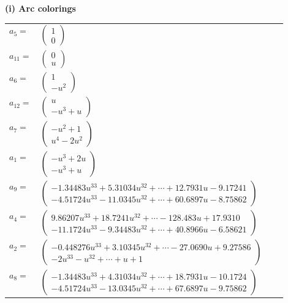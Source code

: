 \documentclass[1p]{elsarticle_modified}
\theoremstyle{definition}
\begin{document}
\flushleft \textbf{(i) Arc colorings}\\
\begin{tabular}{m{7pt} m{180pt} m{7pt} m{180pt} }
\flushright $a_{5}=$&$\begin{pmatrix}1\\0\end{pmatrix}$ \\
\flushright $a_{11}=$&$\begin{pmatrix}0\\u\end{pmatrix}$ \\
\flushright $a_{6}=$&$\begin{pmatrix}1\\- u^2\end{pmatrix}$ \\
\flushright $a_{12}=$&$\begin{pmatrix}u\\- u^3+u\end{pmatrix}$ \\
\flushright $a_{7}=$&$\begin{pmatrix}- u^2+1\\u^4-2 u^2\end{pmatrix}$ \\
\flushright $a_{1}=$&$\begin{pmatrix}- u^3+2 u\\- u^3+u\end{pmatrix}$ \\
\flushright $a_{9}=$&$\begin{pmatrix}-1.34483 u^{33}+5.31034 u^{32}+\cdots+12.7931 u-9.17241\\-4.51724 u^{33}-11.0345 u^{32}+\cdots+60.6897 u-8.75862\end{pmatrix}$ \\
\flushright $a_{4}=$&$\begin{pmatrix}9.86207 u^{33}+18.7241 u^{32}+\cdots-128.483 u+17.9310\\-11.1724 u^{33}-9.34483 u^{32}+\cdots+40.8966 u-6.58621\end{pmatrix}$ \\
\flushright $a_{2}=$&$\begin{pmatrix}-0.448276 u^{33}+3.10345 u^{32}+\cdots-27.0690 u+9.27586\\-2 u^{33}- u^{32}+\cdots+u+1\end{pmatrix}$ \\
\flushright $a_{8}=$&$\begin{pmatrix}-1.34483 u^{33}+4.31034 u^{32}+\cdots+18.7931 u-10.1724\\-4.51724 u^{33}-13.0345 u^{32}+\cdots+67.6897 u-9.75862\end{pmatrix}$ \\

\end{tabular}
\end{document}
